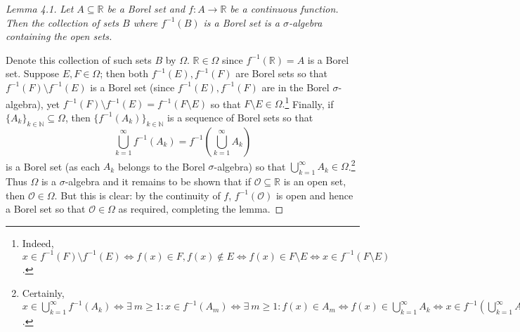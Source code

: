 \begin{proof}[Lemma 4.1]
	\emph{Let \( A \subseteq \mathbb{R} \) be a Borel set and \( f: A \to \mathbb{R} \) be a continuous function. Then the collection of sets \( B \) where \( f^{-1}(B) \) is a Borel set is a \(\sigma\)-algebra containing the open sets.}

	Denote this collection of such sets \( B \) by \( \Omega. \) \( \mathbb{R} \in \Omega \) since \( f^{-1}(\mathbb{R}) = A  \) is a Borel set. Suppose \( E,F \in \Omega \); then both \( f^{-1}(E), f^{-1}(F)   \) are Borel sets so that \( f^{-1}(F) \setminus f^{-1}(E)   \) is a Borel set (since \( f^{-1}(E),f^{-1}(F) \) are in the Borel \(\sigma\)-algebra), yet \( f^{-1} (F) \setminus f^{-1}(E) = f^{-1}(F \setminus E)  \) so that \( F \setminus E \in \Omega. \)\footnote{Indeed, \( x \in f^{-1}(F) \setminus f^{-1}(E)  \iff f(x) \in F, f(x) \notin E \iff f(x) \in F\setminus E \iff x \in f^{-1}(F\setminus E) \).} Finally, if \( \{ A_k \}_{k \in \mathbb{N} } \subseteq \Omega \), then \( \{ f^{-1}(A_k)  \}_{k \in \mathbb{N} }   \) is a sequence of Borel sets so that \[ \bigcup_{k=1}^{\infty} f^{-1}(A_k) = f^{-1}\left ( {\bigcup_{k=1}^{\infty} A_k} \right )    \] is a Borel set (as each \( A_k \) belongs to the Borel \(\sigma\)-algebra) so that \( \bigcup_{k=1}^{\infty} A_k \in \Omega \).\footnote{Certainly, \( x \in \bigcup_{k=1}^{\infty} f^{-1}( A_k) \iff \exists \ m \geq 1 : x \in f^{-1}(A_m) \iff \exists \ m \geq 1 : f(x) \in A_m \iff f(x) \in \bigcup_{k=1}^{\infty} A_k \iff x \in f^{-1}(\bigcup_{k=1}^{\infty} A_k)  \).} Thus \( \Omega \) is a \(\sigma\)-algebra and it remains to be shown that if \( \mathcal{O} \subseteq \mathbb{R} \) is an open set, then \( \mathcal{O} \in \Omega \). But this is clear: by the continuity of \( f \), \( f^{-1} (\mathcal{O} ) \) is open and hence a Borel set so that \( \mathcal{O} \in \Omega \) as required, completing the lemma.
\end{proof}

